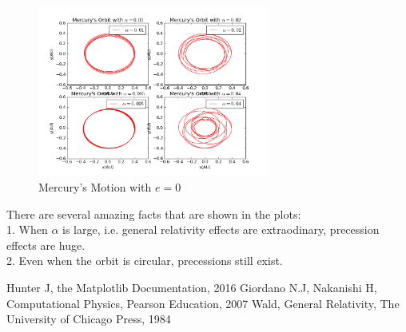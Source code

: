 \documentclass[10pt,a4paper]{article}
\begin{document}
    \begin{figure}[htbp!]
    	\centering
    	\includegraphics[width=3in]{Mercury_7.png}
    	\caption{Mercury's Motion with $e=0$}
    \end{figure}
    There are several amazing facts that are shown in the plots:\\
    1. When $\alpha$ is large, i.e. general relativity effects are extraodinary, precession effects are huge.\\
    2. Even when the orbit is circular, precessions still exist.
    
    \begin{thebibliography}{99}
    	\bibitem{}Hunter J, the Matplotlib Documentation, 2016
    	\bibitem{}Giordano N.J, Nakanishi H, Computational Physics, Pearson Education, 2007
    	\bibitem{}Wald, General Relativity, The University of Chicago Press, 1984
    \end{thebibliography}
\end{document}
